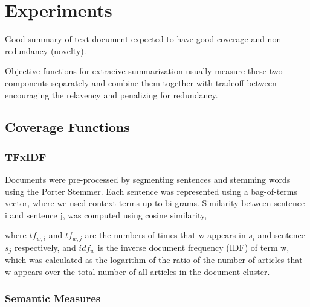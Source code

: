 \chapter{Experiments}

Good summary of text document expected to have good coverage and non-redundancy (novelty).

Objective functions for extracive summarization usually measure these two components separately and combine them together with tradeoff between encouraging the relavency and penalizing for redundancy.


\section{Coverage Functions}

\subsection{TFxIDF}

Documents were pre-processed by segmenting sentences and stemming words using the Porter Stemmer. Each sentence was represented using a bag-of-terms vector, where we used context terms up to bi-grams. Similarity between sentence i and sentence j, was computed using cosine similarity,


where $tf_{w,i}$ and $tf_{w,j}$ are the numbers of times that w appears in $s_i$ and sentence $s_j$ respectively, and
$idf_{w}$ is the inverse document frequency (IDF) of term w, which was calculated as the
logarithm of the ratio of the number of articles that w appears over the total number of all articles in the
document cluster.



\subsection{Semantic Measures}

